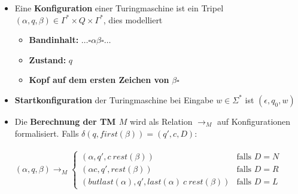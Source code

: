 \documentclass[ieeetran]{article}
\begin{document}
\begin{itemize}
	\item Eine \textbf{Konfiguration} einer Turingmaschine ist ein Tripel $(\alpha, q, \beta) \in \Gamma^* \times Q \times \Gamma^*$, dies modelliert
		\begin{itemize}
		  \item \textbf{Bandinhalt:} $\ldots \square \alpha \beta \square \ldots$

		\item \textbf{Zustand:} $q$
		\item \textbf{Kopf auf dem ersten Zeichen von} $\beta \square$
		\end{itemize}
		\item \textbf{Startkonfiguration} der Turingmaschine bei Eingabe $w \in \Sigma^*$ ist $(\epsilon, q_0, w)$
		\item Die \textbf{Berechnung der TM $M$} wird als Relation $\rightarrow_M$ auf Konfigurationen formalisiert. Falls $\delta(q,first(\beta)) = (q',c , D)$:
\\ \\ \begin{math}
		(\alpha,q,\beta) \rightarrow_M \left\{
			\begin{array}{ll}
				(\alpha,q',c \ rest(\beta)) & \mbox{falls $D = N$}\\
				(\alpha c, q', rest(\beta)) & \mbox{falls $D = R$}\\

				(butlast(\alpha),q',last(\alpha) \ c \ rest(\beta)) & \mbox{falls $D = L$}
		\end{array}
		\right.
	\end{math}


\end{itemize}
\end{document}
